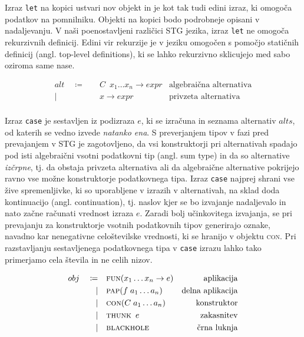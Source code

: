 Izraz \texttt{let} na kopici ustvari nov objekt in je kot tak tudi edini izraz, ki omogoča  podatkov na pomnilniku. Objekti na kopici bodo podrobneje opisani v nadaljevanju. V naši poenostavljeni različici STG jezika, izraz \texttt{let} ne omogoča rekurzivnih definicij. Edini vir rekurzije je v jeziku omogočen s pomočjo statičnih definicij (angl. top-level definitions), ki se lahko rekurzivno sklicujejo med sabo oziroma same nase.

\begin{align*}
	alt \quad \coloneq& \quad C \enspace x_1 \dots x_n \to expr & \text{algebraična alternativa}\\
	\vert& \quad x \to expr & \text{privzeta alternativa}\\
\end{align*}

Izraz \texttt{case} je sestavljen iz podizraza $e$, ki se izračuna in seznama alternativ $alts$, od katerih se vedno izvede \textit{natanko ena}. S preverjanjem tipov v fazi pred prevajanjem v STG je zagotovljeno, da vsi konstruktorji pri alternativah spadajo pod isti algebraični vsotni podatkovni tip (angl. sum type) in da so alternative \textit{izčrpne}, tj. da obstaja privzeta alternativa ali da algebraične alternative pokrijejo ravno vse možne konstruktorje podatkovnega tipa. Izraz \texttt{case} najprej shrani vse žive spremenljivke, ki so uporabljene v izrazih v alternativah, na sklad doda kontinuacijo (angl. continuation), tj. naslov kjer se bo izvajanje nadaljevalo in nato začne računati vrednost izraza $e$. Zaradi bolj učinkovitega izvajanja, se pri prevajanju za konstruktorje vsotnih podatkovnih tipov generirajo oznake, navadno kar nenegativne celoštevilske vrednosti, ki se hranijo v objektu \textsc{con}. Pri razstavljanju sestavljenega podatkovnega tipa v \texttt{case} izrazu lahko tako primerjamo cela števila in ne celih nizov.

\begin{align*}
	obj \quad \coloneq& \quad \textsc{fun}(x_1 \dots x_n \to e) & \text{aplikacija}\\
	\vert& \quad \textsc{pap}(f \; a_1 \dots a_n) & \text{delna aplikacija}\\
	\vert& \quad \textsc{con}(C \; a_1 \dots a_n) & \text{konstruktor}\\
	\vert& \quad \textsc{thunk} \enspace e & \text{zakasnitev}\\
	\vert& \quad \textsc{blackhole} & \text{črna luknja}
\end{align*}

